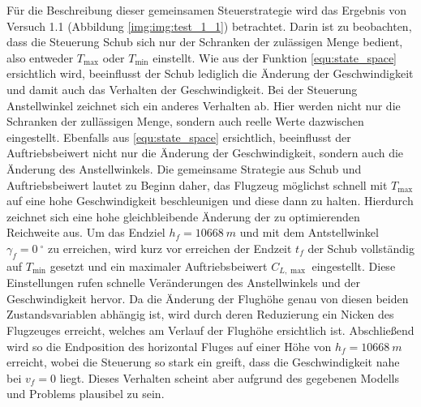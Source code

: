 Für die Beschreibung dieser gemeinsamen Steuerstrategie wird das Ergebnis von Versuch 1.1 (Abbildung \ref{img:img:test_1_1}) betrachtet. Darin ist zu beobachten, dass die Steuerung Schub sich nur der Schranken der zulässigen Menge bedient, also entweder $T_{\max}$ oder $T_{\min}$ einstellt. Wie aus der Funktion \ref{equ:state_space} ersichtlich wird, beeinflusst der Schub lediglich die Änderung der Geschwindigkeit und damit auch das Verhalten der Geschwindigkeit. Bei der Steuerung Anstellwinkel zeichnet sich ein anderes Verhalten ab. Hier werden nicht nur die Schranken der zullässigen Menge, sondern auch reelle Werte dazwischen eingestellt. Ebenfalls aus \ref{equ:state_space} ersichtlich, beeinflusst der Auftriebsbeiwert nicht nur die Änderung der Geschwindigkeit, sondern auch die Änderung des Anstellwinkels. Die gemeinsame Strategie aus Schub und Auftriebsbeiwert lautet zu Beginn daher, das Flugzeug möglichst schnell mit $T_{\max}$ auf eine hohe Geschwindigkeit beschleunigen und diese dann zu halten. Hierdurch zeichnet sich eine hohe gleichbleibende Änderung der zu optimierenden Reichweite aus. Um das Endziel $h_f = 10668 \ m$ und mit dem Antstellwinkel $\gamma_f = 0 \ ^\circ$ zu erreichen, wird kurz vor erreichen der Endzeit $t_f$ der Schub vollständig auf $T_{\min}$ gesetzt und ein maximaler Auftriebsbeiwert $C_{L, \max}$ eingestellt. Diese Einstellungen rufen schnelle Veränderungen des Anstellwinkels und der Geschwindigkeit hervor. Da die Änderung der Flughöhe genau von diesen beiden Zustandsvariablen abhängig ist, wird durch deren Reduzierung ein Nicken des Flugzeuges erreicht, welches am Verlauf der Flughöhe ersichtlich ist. Abschließend wird so die Endposition des horizontal Fluges auf einer Höhe von $h_f = 10668 \ m$ erreicht, wobei die Steuerung so stark ein greift, dass die Geschwindigkeit nahe bei $v_f = 0$ liegt. Dieses Verhalten scheint aber aufgrund des gegebenen Modells und Problems plausibel zu sein.


